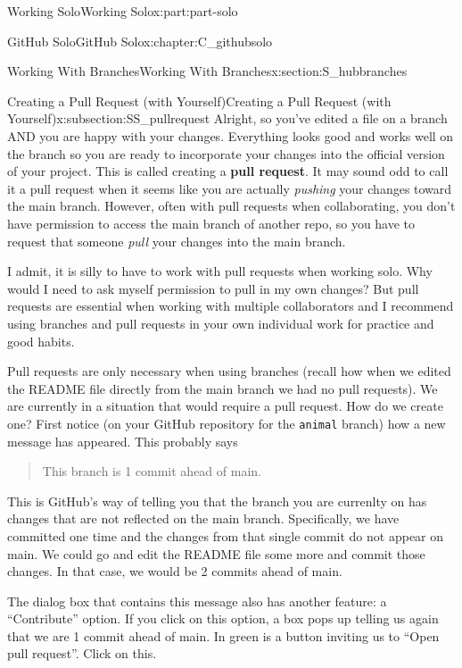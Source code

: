 \documentclass[oneside,10pt,]{book}
\newcommand{\mono}[1]{\texttt{#1}}
\newcommand{\terminology}[1]{\textbf{#1}}
\begin{document}
\begin{partptx}{Working Solo}{}{Working Solo}{}{}{x:part:part-solo}
\begin{chapterptx}{GitHub Solo}{}{GitHub Solo}{}{}{x:chapter:C_githubsolo}
\begin{sectionptx}{Working With Branches}{}{Working With Branches}{}{}{x:section:S_hubbranches}
\typeout{************************************************}
%
\begin{subsectionptx}{Creating a Pull Request (with Yourself)}{}{Creating a Pull Request (with Yourself)}{}{}{x:subsection:SS_pullrequest}
%
%
%
%
Alright, so you've edited a file on a branch AND you are happy with your changes. Everything looks good and works well on the branch so you are ready to incorporate your changes into the official version of your project. This is called creating a \terminology{pull request}. It may sound odd to call it a pull request when it seems like you are actually \emph{pushing} your changes toward the main branch. However, often with pull requests when collaborating, you don't have permission to access the main branch of another repo, so you have to request that someone \emph{pull} your changes into the main branch.%
\par
I admit, it is silly to have to work with pull requests when working solo. Why would I need to ask myself permission to pull in my own changes? But pull requests are essential when working with multiple collaborators and I recommend using branches and pull requests in your own individual work for practice and good habits.%
\par
{} Pull requests are only necessary when using branches (recall how when we edited the README file directly from the main branch we had no pull requests). We are currently in a situation that would require a pull request. How do we create one? First notice (on your GitHub repository for the \mono{animal} branch) how a new message has appeared. This probably says \begin{quote}%
This branch is 1 commit ahead of main.\end{quote}
 This is GitHub's way of telling you that the branch you are currenlty on has changes that are not reflected on the main branch. Specifically, we have committed one time and the changes from that single commit do not appear on main. We could go and edit the README file some more and commit those changes. In that case, we would be 2 commits ahead of main.%
\par
The dialog box that contains this message also has another feature: a ``Contribute'' option. If you click on this option, a box pops up telling us again that we are 1 commit ahead of main. In green is a button inviting us to ``Open pull request''. Click on this.%
\par

\end{subsectionptx}
\end{sectionptx}
\end{chapterptx}
\end{partptx}
\end{document}
